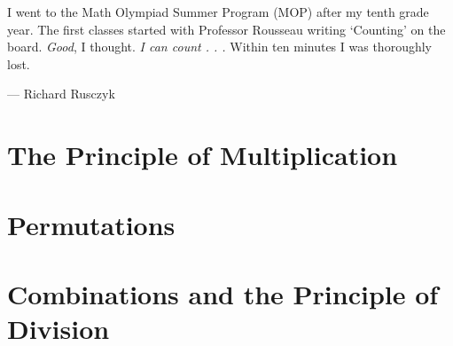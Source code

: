 \epigraph{I went to the Math Olympiad Summer Program (MOP) after my tenth grade year. The first classes started with Professor Rousseau writing ‘Counting’ on the board. \textit{Good}, I thought. \textit{I can count . . . } Within ten minutes I was thoroughly lost.}{--- Richard Rusczyk}


\section{The Principle of Multiplication}


\section{Permutations}


\section{Combinations and the Principle of Division}

